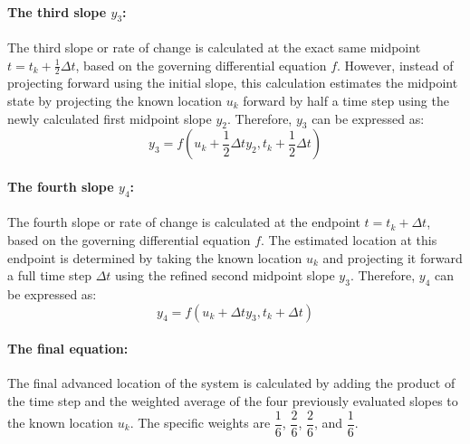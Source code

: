 \documentclass{article}
\begin{document}
\paragraph{The third slope $y_3$:}
The third slope or rate of change is calculated at the exact same midpoint $t=t_k + \frac{1}{2}\Delta t$, based on the governing differential equation $f$. However, instead of projecting forward using the initial slope, this calculation estimates the midpoint state by projecting the known location $u_k$ forward by half a time step using the newly calculated first midpoint slope $y_2$. Therefore, $y_3$ can be expressed as:
\[y_3 = f\left(u_k + \frac{1}{2}\Delta t y_2, t_k + \frac{1}{2}\Delta t\right)\]

\paragraph{The fourth slope $y_4$:}
The fourth slope or rate of change is calculated at the endpoint $t=t_k + \Delta t$, based on the governing differential equation $f$. The estimated location at this endpoint is determined by taking the known location $u_k$ and projecting it forward a full time step $\Delta t$ using the refined second midpoint slope $y_3$. Therefore, $y_4$ can be expressed as:
\[y_4 = f\left(u_k + \Delta t y_3, t_k + \Delta t\right)\]

\paragraph{The final equation:}
The final advanced location of the system is calculated by adding the product of the time step and the weighted average of the four previously evaluated slopes to the known location $u_k$. The specific weights are $\dfrac{1}{6}$, $\dfrac{2}{6}$, $\dfrac{2}{6}$, and $\dfrac{1}{6}$. 
\end{document}
